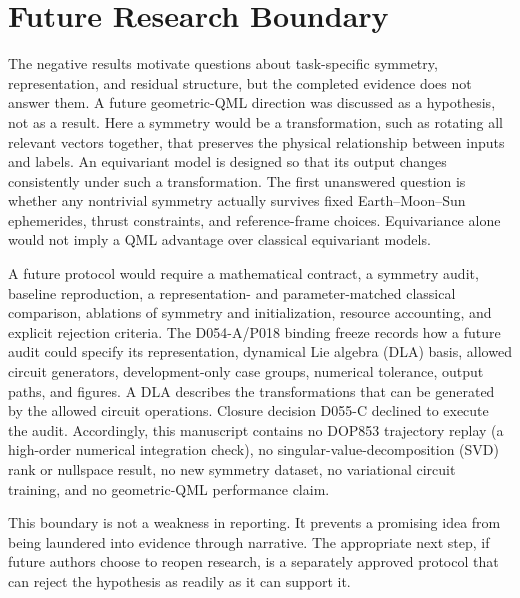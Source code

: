 \section{Future Research Boundary}

The negative results motivate questions about task-specific symmetry,
representation, and residual structure, but the completed evidence does not
answer them. A future geometric-QML direction was discussed as a hypothesis,
not as a result. Here a symmetry would be a transformation, such as rotating
all relevant vectors together, that preserves the physical relationship between
inputs and labels. An equivariant model is designed so that its output changes
consistently under such a transformation. The first unanswered question is
whether any nontrivial symmetry actually survives fixed Earth--Moon--Sun
ephemerides, thrust constraints, and reference-frame choices. Equivariance
alone would not imply a QML advantage over classical equivariant models.

A future protocol would require a mathematical contract, a symmetry audit,
baseline reproduction, a representation- and parameter-matched classical
comparison, ablations of symmetry and initialization, resource accounting,
and explicit rejection criteria. The D054-A/P018 binding freeze records how a
future audit could specify its representation, dynamical Lie algebra (DLA)
basis, allowed circuit generators, development-only case groups, numerical
tolerance, output paths, and figures. A DLA describes the transformations that
can be generated by the allowed circuit operations. Closure decision D055-C
declined to execute the audit. Accordingly, this manuscript contains no
DOP853 trajectory replay (a high-order numerical integration check), no
singular-value-decomposition (SVD) rank or nullspace result, no new symmetry
dataset, no variational circuit training, and no geometric-QML performance
claim.

This boundary is not a weakness in reporting. It prevents a promising idea
from being laundered into evidence through narrative. The appropriate next
step, if future authors choose to reopen research, is a separately approved
protocol that can reject the hypothesis as readily as it can support it.
